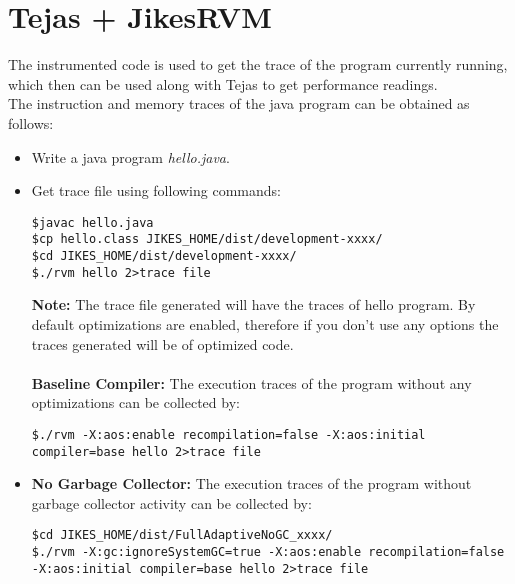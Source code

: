 \documentclass[a4paper]{article}
\begin{document}
\section{Tejas + JikesRVM}
The instrumented code is used to get the trace of the program currently running, which then can be used along with Tejas to get performance readings.\\
The instruction and memory traces of the java program can be obtained as follows:
\begin{itemize}
\item Write a java program \textit{hello.java}.
\item Get trace file using following commands:
\begin{verbatim}
$javac hello.java
$cp hello.class JIKES_HOME/dist/development-xxxx/
$cd JIKES_HOME/dist/development-xxxx/
$./rvm hello 2>trace file
\end{verbatim}
\textbf{Note:} The trace file generated will have the traces of hello program. By default optimizations are enabled, therefore if you don’t use any options the traces generated will be of optimized code.\\\\
\textbf{Baseline Compiler:} The execution traces of the program without any optimizations can
be collected by:
\begin{verbatim}
$./rvm -X:aos:enable recompilation=false -X:aos:initial compiler=base hello 2>trace file
\end{verbatim}
	
\item \textbf{No Garbage Collector:} The execution traces of the program without garbage collector activity can be collected by:
\begin{verbatim}
$cd JIKES_HOME/dist/FullAdaptiveNoGC_xxxx/
$./rvm -X:gc:ignoreSystemGC=true -X:aos:enable recompilation=false 
-X:aos:initial compiler=base hello 2>trace file
\end{verbatim}
\end{itemize}
\end{document}
